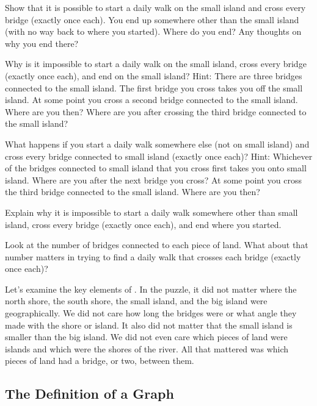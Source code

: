 \begin{act}
\begin{actpart}
        \item Show that it is possible to start a daily walk on the small island and cross every bridge (exactly once each).  You end up somewhere other than the small island (with no way back to where you started).  Where do you end?  Any thoughts on why you end there?
        \item Why is it impossible to start a daily walk on the small island, cross every bridge (exactly once each), and end on the small island?  Hint: There are three bridges connected to the small island. The first bridge you cross takes you off the small island.  At some point you cross a second bridge connected to the small island.  Where are you then?  Where are you after crossing the third bridge connected to the small island?  
        \item What happens if you start a daily walk somewhere else (not on small island) and cross every bridge connected to small island (exactly once each)? Hint: Whichever of the bridges connected to small island that you cross first takes you onto small island.  Where are you after the next bridge you cross?  At some point you cross the third bridge connected to the small island.  Where are you then?
        \item Explain why it is impossible to start a daily walk somewhere other than small island, cross every bridge (exactly once each), and end where you started.  
        \item Look at the number of bridges connected to each piece of land.  What about that number matters in trying to find a daily walk that crosses each bridge (exactly once each)?
    \end{actpart}
\end{act}

Let's examine the key elements of .  In the puzzle, it did not matter where the north shore, the south shore, the small island, and the big island were geographically.  We did not care how long the bridges were or what angle they made with the shore or island.  It also did not matter that the small island is smaller than the big island.  We did not even care which pieces of land were islands and which were the shores of the river. All that mattered was which pieces of land had a bridge, or two, between them.    


\newcommand{\subdefngraph}{The Definition of a Graph}
\subsection{\subdefngraph}
\label{sub_defn_graph}

